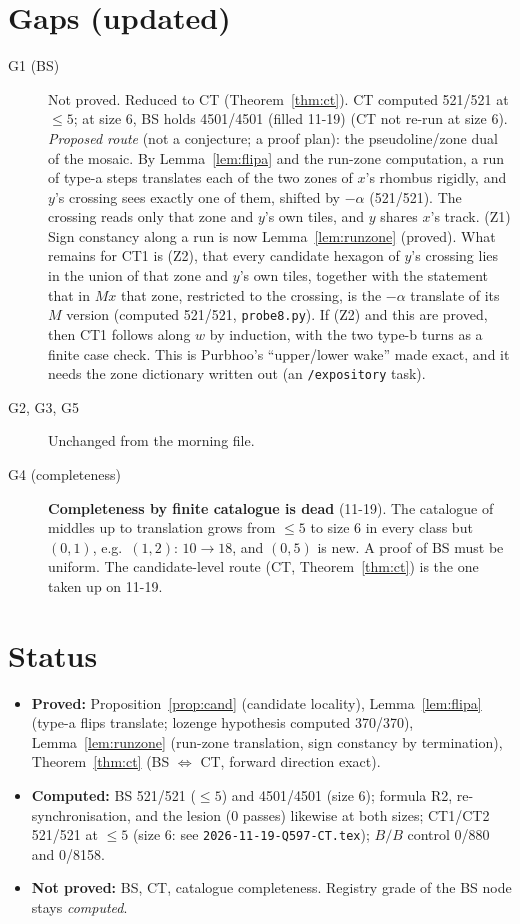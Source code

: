\documentclass[11pt]{article}
\theoremstyle{definition}\newtheorem{definition}[theorem]{Definition}\newtheorem{remark}[theorem]{Remark}
\begin{document}
\section{Gaps (updated)}\label{sec:gaps}
\begin{description}
\item[G1 (BS)] Not proved. Reduced to CT (Theorem~\ref{thm:ct}). CT computed 521/521 at $\le5$; at size 6, BS holds 4501/4501 (filled 11-19) (CT not re-run at size 6).
\emph{Proposed route} (not a conjecture; a proof plan): the pseudoline/zone dual of the mosaic. By Lemma~\ref{lem:flipa} and the run-zone computation, a run of type-a steps translates each of the two zones of $x$'s rhombus rigidly, and $y$'s crossing sees exactly one of them, shifted by $-\alpha$ (521/521).
The crossing reads only that zone and $y$'s own tiles, and $y$ shares $x$'s track. (Z1) Sign constancy along a run is now Lemma~\ref{lem:runzone} (proved). What remains for CT1 is (Z2), that every candidate hexagon of $y$'s crossing lies in the union of that zone and $y$'s own tiles, together with the statement that in $Mx$ that zone, restricted to the crossing, is the $-\alpha$ translate of its $M$ version (computed 521/521, \texttt{probe8.py}). If (Z2) and this are proved,
then CT1 follows along $w$ by induction, with the two type-b turns as a finite case check. This is Purbhoo's ``upper/lower wake'' made exact, and it needs the zone dictionary written out (an \texttt{/expository} task).
\item[G2, G3, G5] Unchanged from the morning file.
\item[G4 (completeness)] \textbf{Completeness by finite catalogue is dead} (11-19). The catalogue of middles up to translation grows from $\le5$ to size 6 in every class but $(0,1)$, e.g.\ $(1,2)$: $10\to18$, and $(0,5)$ is new. A proof of BS must be uniform. The candidate-level route (CT, Theorem~\ref{thm:ct}) is the one taken up on 11-19.
\end{description}

\section{Status}
\begin{itemize}
\item \textbf{Proved:} Proposition~\ref{prop:cand} (candidate locality), Lemma~\ref{lem:flipa} (type-a flips translate; lozenge hypothesis computed 370/370), Lemma~\ref{lem:runzone} (run-zone translation, sign constancy by termination), Theorem~\ref{thm:ct} (BS $\Leftrightarrow$ CT, forward direction exact).
\item \textbf{Computed:} BS 521/521 ($\le5$) and 4501/4501 (size 6); formula R2, re-synchronisation, and the lesion (0 passes) likewise at both sizes; CT1/CT2 521/521 at $\le5$ (size 6: see \texttt{2026-11-19-Q597-CT.tex}); $B/B$ control 0/880 and 0/8158.
\item \textbf{Not proved:} BS, CT, catalogue completeness. Registry grade of the BS node stays \emph{computed}.
\end{itemize}
\end{document}
